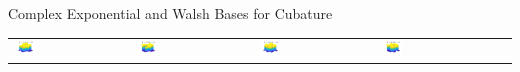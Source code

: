 \documentclass[11pt,compress,xcolor={usenames,dvipsnames},aspectratio=169]{beamer}
\begin{document}
\begin{frame}{Complex Exponential and Walsh Bases for Cubature}
\begin{tabular}{>{\centering}m{}>{\centering}m{}>{\centering}m{}>{\centering}m{}>{\centering}m{}}
\includegraphics[width =0.18\textwidth]{ProgramsImages/Walsh_Degree_1_2.png}  &
\includegraphics[width =0.18\textwidth]{ProgramsImages/Walsh_Degree_1_3.png}  &
\includegraphics[width =0.18\textwidth]{ProgramsImages/Walsh_Degree_2_2.png}  &
\includegraphics[width =0.18\textwidth]{ProgramsImages/Walsh_Degree_2_3.png} 
	\end{tabular}
\end{frame}
\end{document}
